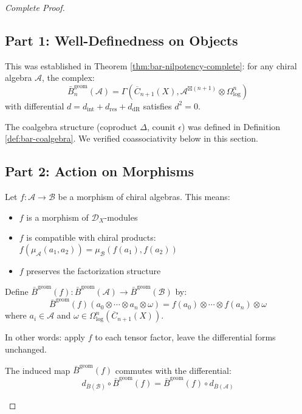 \begin{proof}[Complete Proof]

\subsection*{Part 1: Well-Definedness on Objects}

This was established in Theorem \ref{thm:bar-nilpotency-complete}: for any chiral algebra $\mathcal{A}$, the complex:
$$\bar{B}^{\text{geom}}_n(\mathcal{A}) = \Gamma(\overline{C}_{n+1}(X), \mathcal{A}^{\boxtimes(n+1)} \otimes \Omega^n_{\log})$$
with differential $d = d_{\text{int}} + d_{\text{res}} + d_{\text{dR}}$ satisfies $d^2 = 0$.

The coalgebra structure (coproduct $\Delta$, counit $\epsilon$) was defined in Definition \ref{def:bar-coalgebra}. We verified coassociativity below in this section.

\subsection*{Part 2: Action on Morphisms}

Let $f: \mathcal{A} \to \mathcal{B}$ be a morphism of chiral algebras. This means:
\begin{itemize}
\item $f$ is a morphism of $\mathcal{D}_X$-modules
\item $f$ is compatible with chiral products: $f(\mu_\mathcal{A}(a_1, a_2)) = \mu_\mathcal{B}(f(a_1), f(a_2))$
\item $f$ preserves the factorization structure
\end{itemize}

\begin{definition}\label{def:bar-induced-map}
Define $\bar{B}^{\text{geom}}(f): \bar{B}^{\text{geom}}(\mathcal{A}) \to \bar{B}^{\text{geom}}(\mathcal{B})$ by:
$$\bar{B}^{\text{geom}}(f)(a_0 \otimes \cdots \otimes a_n \otimes \omega) = f(a_0) \otimes \cdots \otimes f(a_n) \otimes \omega$$
where $a_i \in \mathcal{A}$ and $\omega \in \Omega^n_{\log}(\overline{C}_{n+1}(X))$.

In other words: apply $f$ to each tensor factor, leave the differential forms unchanged.
\end{definition}

\begin{lemma}\label{lem:bar-induced-chain-map}
The induced map $\bar{B}^{\text{geom}}(f)$ commutes with the differential:
$$d_{\bar{B}(\mathcal{B})} \circ \bar{B}^{\text{geom}}(f) = \bar{B}^{\text{geom}}(f) \circ d_{\bar{B}(\mathcal{A})}$$
\end{lemma}


\end{proof}
